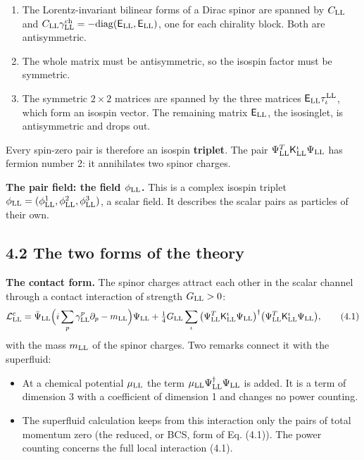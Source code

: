 \documentclass[
  10pt,
]{article}
\providecommand{\tightlist}{%
  \setlength{\itemsep}{0pt}\setlength{\parskip}{0pt}}
\begin{document}
\begin{enumerate}
\def\labelenumi{\arabic{enumi}.}
\tightlist
\item
  The Lorentz-invariant bilinear forms of a Dirac spinor are spanned by
  \(C_{\rm LL}\) and
  \(C_{\rm LL}\gamma^{\rm ch}_{\rm LL}=-\mathrm{diag}(\mathsf E_{\rm LL},\mathsf E_{\rm LL})\),
  one for each chirality block. Both are antisymmetric.
\item
  The whole matrix must be antisymmetric, so the isospin factor must be
  symmetric.
\item
  The symmetric \(2\times2\) matrices are spanned by the three matrices
  \(\mathsf E_{\rm LL}\tau^{\rm LL}_\iota\), which form an isospin
  vector. The remaining matrix \(\mathsf E_{\rm LL}\), the isosinglet,
  is antisymmetric and drops out.
\end{enumerate}

Every spin-zero pair is therefore an isospin \textbf{triplet}. The pair
\(\Psi^T_{\rm LL}\mathsf K^\iota_{\rm LL}\Psi_{\rm LL}\) has fermion
number 2: it annihilates two spinor charges.

\textbf{The pair field: the field \(\phi_{\rm LL}\).} This is a complex
isospin triplet
\(\phi_{\rm LL}=(\phi^1_{\rm LL},\phi^2_{\rm LL},\phi^3_{\rm LL})\), a
scalar field. It describes the scalar pairs as particles of their own.

\hypertarget{the-two-forms-of-the-theory}{%
\subsection{4.2 The two forms of the
theory}\label{the-two-forms-of-the-theory}}

\textbf{The contact form.} The spinor charges attract each other in the
scalar channel through a contact interaction of strength
\(G_{\rm LL}>0\):
\[\mathcal L^{\rm c}_{\rm LL}=\bar\Psi_{\rm LL}\Big(i\sum_p\gamma^p_{\rm LL}\partial_p-m_{\rm LL}\Big)\Psi_{\rm LL}+\tfrac14G_{\rm LL}\sum_\iota\big(\Psi^T_{\rm LL}\mathsf K^\iota_{\rm LL}\Psi_{\rm LL}\big)^\dagger\big(\Psi^T_{\rm LL}\mathsf K^\iota_{\rm LL}\Psi_{\rm LL}\big), \tag{4.1}\]
with the mass \(m_{\rm LL}\) of the spinor charges. Two remarks connect
it with the superfluid:

\begin{itemize}
\tightlist
\item
  At a chemical potential \(\mu_{\rm LL}\) the term
  \(\mu_{\rm LL}\Psi^\dagger_{\rm LL}\Psi_{\rm LL}\) is added. It is a
  term of dimension 3 with a coefficient of dimension 1 and changes no
  power counting.
\item
  The superfluid calculation keeps from this interaction only the pairs
  of total momentum zero (the reduced, or BCS, form of Eq. (4.1)). The
  power counting concerns the full local interaction (4.1).
\end{itemize}
\end{document}
